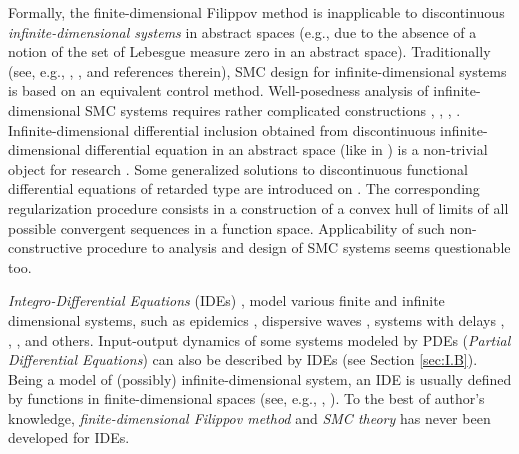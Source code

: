 \documentclass{article}
\begin{document}
Formally, the finite-dimensional Filippov method is inapplicable to discontinuous  \textit{infinite-dimensional systems} in abstract spaces \cite{DaleckyKrein1974:Book} (e.g., due to the absence of a notion of the set of Lebesgue measure zero in an abstract space). 
Traditionally (see, e.g., \cite{OrlovUtkin1985:DAN}, \cite{Orlov_elal2004:IJC},  \cite{Orlov2008:Book} and references therein), 
SMC design for infinite-dimensional systems  is based on an equivalent control method.  
Well-posedness analysis of  infinite-dimensional  SMC systems requires rather complicated constructions \cite{Levaggi2002:DIE},  \cite{Pisano_etal2011:SIAM_JCO},  \cite{Levaggi2013:DCDS}, \cite{Orlov2020:Book}.
 Infinite-dimensional differential inclusion  obtained from discontinuous infinite-dimensional differential equation in an  abstract  space (like in  \cite{Mohet_etal2023:SCL}) is a non-trivial object for research \cite{Tolstonogov2000:Book}. Some generalized solutions to discontinuous  functional differential equations of retarded type are introduced on \cite[page 58]{KolmanovskiiMyshkis1992:Book}.  The corresponding  regularization procedure consists in a construction of a convex hull of limits of all possible convergent sequences in a function space. Applicability of such non-constructive procedure to analysis and design of SMC systems seems questionable too.
 
 
\textit{Integro-Differential Equations} (IDEs) \cite{Lakshmikantham_etal1995:Book}, \cite{OReganMeehan1998:Book} model various finite and infinite dimensional systems, such as
epidemics \cite{KermackMcKendrick1991:BMB},  dispersive waves \cite{Debnath2005:Book},
systems with delays \cite{Hale1977:Book}, \cite{Fridman2014:Book}, \cite{Orlov2020:Book}, and others.  Input-output dynamics of some systems modeled by PDEs (\textit{Partial Differential Equations}) can also be described by IDEs (see Section \ref{sec:I.B}). 
Being a model of (possibly) infinite-dimensional system, an IDE is usually defined by  functions  in finite-dimensional spaces
(see, e.g., \cite{Lakshmikantham_etal1995:Book}, \cite{OReganMeehan1998:Book}). To the best of author's knowledge, \textit{finite-dimensional Filippov method} and \textit{SMC theory}  has never been developed
for  IDEs.
\vspace{-2mm}
\end{document}
